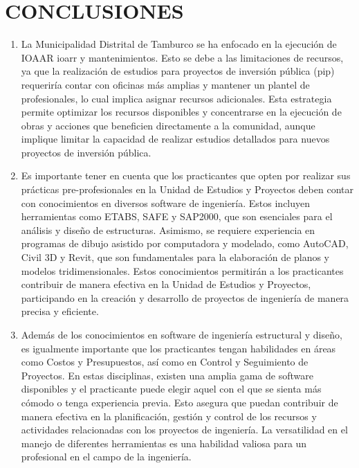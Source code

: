\chapter{CONCLUSIONES}
\begin{enumerate}
	\item La Municipalidad Distrital de Tamburco se ha enfocado en la ejecución de IOAAR \acrlong{ioarr} y mantenimientos. Esto se debe a las limitaciones de recursos, ya que la realización de estudios para proyectos de inversión pública (\acrshort{pip}) requeriría contar con oficinas más amplias y mantener un plantel de profesionales, lo cual implica asignar recursos adicionales. Esta estrategia permite optimizar los recursos disponibles y concentrarse en la ejecución de obras y acciones que beneficien directamente a la comunidad, aunque implique limitar la capacidad de realizar estudios detallados para nuevos proyectos de inversión pública.

	\item Es importante tener en cuenta que los practicantes que opten por realizar sus prácticas pre-profesionales en la Unidad de Estudios y Proyectos deben contar con conocimientos en diversos software de ingeniería. Estos incluyen herramientas como ETABS, SAFE y SAP2000, que son esenciales para el análisis y diseño de estructuras. Asimismo, se requiere experiencia en programas de dibujo asistido por computadora y modelado, como AutoCAD, Civil 3D y Revit, que son fundamentales para la elaboración de planos y modelos tridimensionales.
	Estos conocimientos permitirán a los practicantes contribuir de manera efectiva en la Unidad de Estudios y Proyectos, participando en la creación y desarrollo de proyectos de ingeniería de manera precisa y eficiente.

	\item Además de los conocimientos en software de ingeniería estructural y diseño, es igualmente importante que los practicantes tengan habilidades en áreas como Costos y Presupuestos, así como en Control y Seguimiento de Proyectos. En estas disciplinas, existen una amplia gama de software disponibles y el practicante puede elegir aquel con el que se sienta más cómodo o tenga experiencia previa. Esto asegura que puedan contribuir de manera efectiva en la planificación, gestión y control de los recursos y actividades relacionadas con los proyectos de ingeniería. La versatilidad en el manejo de diferentes herramientas es una habilidad valiosa para un profesional en el campo de la ingeniería.


\end{enumerate}
